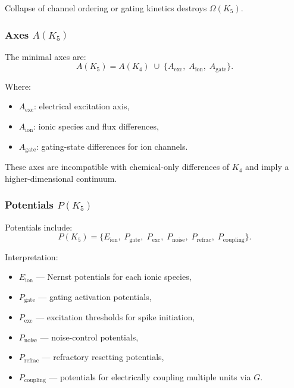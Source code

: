Collapse of channel ordering or gating kinetics destroys $\Omega(K_5)$.

\subsubsection{Axes \texorpdfstring{$A(K_5)$}{A(K_5)}}

The minimal axes are:
\[
A(K_5) = A(K_4)\; \cup\;
\{ A_{\mathrm{exc}},\; A_{\mathrm{ion}},\; A_{\mathrm{gate}} \}.
\]

Where:
\begin{itemize}
    \item $A_{\mathrm{exc}}$: electrical excitation axis,
    \item $A_{\mathrm{ion}}$: ionic species and flux differences,
    \item $A_{\mathrm{gate}}$: gating-state differences for ion channels.
\end{itemize}

These axes are incompatible with chemical-only differences of $K_4$ and
imply a higher-dimensional continuum.

\subsubsection{Potentials \texorpdfstring{$P(K_5)$}{P(K_5)}}

Potentials include:
\[
P(K_5)=\{
E_{\mathrm{ion}},\;
P_{\mathrm{gate}},\;
P_{\mathrm{exc}},\;
P_{\mathrm{noise}},\;
P_{\mathrm{refrac}},\;
P_{\mathrm{coupling}}
\}.
\]

Interpretation:
\begin{itemize}
    \item $E_{\mathrm{ion}}$ — Nernst potentials for each ionic species,
    \item $P_{\mathrm{gate}}$ — gating activation potentials,
    \item $P_{\mathrm{exc}}$ — excitation thresholds for spike initiation,
    \item $P_{\mathrm{noise}}$ — noise-control potentials,
    \item $P_{\mathrm{refrac}}$ — refractory resetting potentials,
    \item $P_{\mathrm{coupling}}$ — potentials for electrically coupling
          multiple units via $G$.
\end{itemize}

